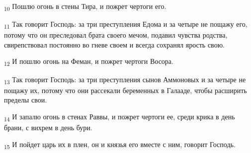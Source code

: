 \begin{tcolorbox}
\textsubscript{10} Пошлю огонь в стены Тира, и пожрет чертоги его.
\end{tcolorbox}
\begin{tcolorbox}
\textsubscript{11} Так говорит Господь: за три преступления Едома и за четыре не пощажу его, потому что он преследовал брата своего мечом, подавил чувства родства, свирепствовал постоянно во гневе своем и всегда сохранял ярость свою.
\end{tcolorbox}
\begin{tcolorbox}
\textsubscript{12} И пошлю огонь на Феман, и пожрет чертоги Восора.
\end{tcolorbox}
\begin{tcolorbox}
\textsubscript{13} Так говорит Господь: за три преступления сынов Аммоновых и за четыре не пощажу их, потому что они рассекали беременных в Галааде, чтобы расширить пределы свои.
\end{tcolorbox}
\begin{tcolorbox}
\textsubscript{14} И запалю огонь в стенах Раввы, и пожрет чертоги ее, среди крика в день брани, с вихрем в день бури.
\end{tcolorbox}
\begin{tcolorbox}
\textsubscript{15} И пойдет царь их в плен, он и князья его вместе с ним, говорит Господь.
\end{tcolorbox}
